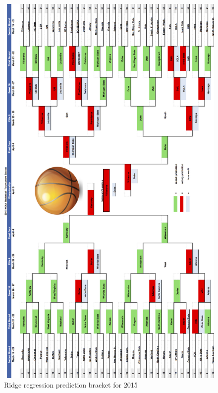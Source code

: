 \documentclass{article} %
\begin{document}
\begin{figure}[H]
\begin{center}
   \includegraphics[scale = 0.3]{bracket.jpg}

\caption{Ridge regression prediction bracket for 2015}
\end{center}
\end{figure}
\end{document}
